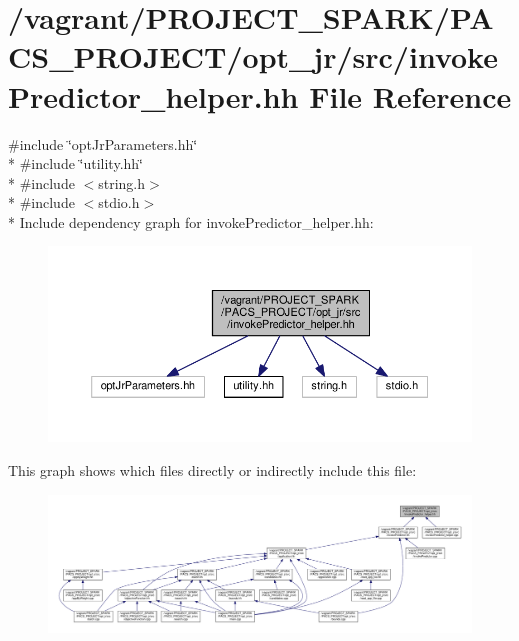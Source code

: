 \hypertarget{invokePredictor__helper_8hh}{\section{/vagrant/\-P\-R\-O\-J\-E\-C\-T\-\_\-\-S\-P\-A\-R\-K/\-P\-A\-C\-S\-\_\-\-P\-R\-O\-J\-E\-C\-T/opt\-\_\-jr/src/invoke\-Predictor\-\_\-helper.hh File Reference}
\label{invokePredictor__helper_8hh}
}
{\ttfamily \#include \char`\"{}opt\-Jr\-Parameters.\-hh\char`\"{}}\\*
{\ttfamily \#include \char`\"{}utility.\-hh\char`\"{}}\\*
{\ttfamily \#include $<$string.\-h$>$}\\*
{\ttfamily \#include $<$stdio.\-h$>$}\\*
Include dependency graph for invoke\-Predictor\-\_\-helper.\-hh\-:\nopagebreak
\begin{figure}[H]
\begin{center}
\leavevmode
\includegraphics[width=350pt]{invokePredictor__helper_8hh__incl}
\end{center}
\end{figure}
This graph shows which files directly or indirectly include this file\-:\nopagebreak
\begin{figure}[H]
\begin{center}
\leavevmode
\includegraphics[width=350pt]{invokePredictor__helper_8hh__dep__incl}
\end{center}
\end{figure}
